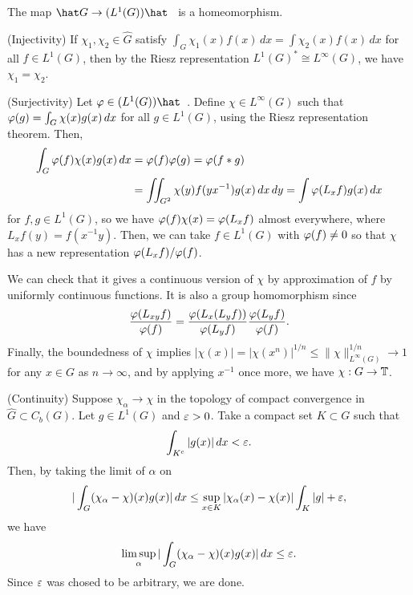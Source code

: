 \documentclass[a4paper]{article}
\begin{document}
\begin{prop}
The map $\hat G\to(L^1(G))\hat\enspace$ is a homeomorphism.
\end{prop}
\begin{pf}
(Injectivity)
If $\chi_1,\chi_2\in\hat G$ satisfy $\int_G\chi_1(x)f(x)\,dx=\int\chi_2(x)f(x)\,dx$ for all $f\in L^1(G)$, then by the Riesz representation $L^1(G)^*\cong L^\infty(G)$, we have $\chi_1=\chi_2$.


(Surjectivity)
Let $\f\in(L^1(G))\hat\enspace$.
Define $\chi\in L^\infty(G)$ such that $\varphi(g)=\int_G\chi(x)g(x)\,dx$ for all $g\in L^1(G)$, using the Riesz representation theorem.
Then,
\begin{align*}
\int_G\varphi(f)\chi(x)g(x)\,dx&=\varphi(f)\varphi(g)=\varphi(f*g)\\
&=\iint_{G^2}\chi(y)f(yx^{-1})g(x)\,dx\,dy=\int\varphi(L_xf)g(x)\,dx
\end{align*}
for $f,g\in L^1(G)$, so we have $\varphi(f)\chi(x)=\varphi(L_xf)$ almost everywhere, where $L_xf(y)=f(x^{-1}y)$.
Then, we can take $f\in L^1(G)$ with $\varphi(f)\ne0$ so that $\chi$ has a new representation $\varphi(L_xf)/\varphi(f)$.

We can check that it gives a continuous version of $\chi$ by approximation of $f$ by uniformly continuous functions.
It is also a group homomorphism since
\[\frac{\varphi(L_{xy}f)}{\varphi(f)}=\frac{\varphi(L_x(L_yf))}{\varphi(L_yf)}\frac{\varphi(L_yf)}{\varphi(f)}.\]
Finally, the boundedness of $\chi$ implies $|\chi(x)|=|\chi(x^n)|^{1/n}\le\|\chi\|_{L^\infty(G)}^{1/n}\to1$ for any $x\in G$ as $n\to\infty$, and by applying $x^{-1}$ once more, we have $\chi:G\to\mathbb{T}$.

(Continuity)
Suppose $\chi_\alpha\to\chi$ in the topology of compact convergence in $\hat G\subset C_b(G)$.
Let $g\in L^1(G)$ and $\varepsilon>0$.
Take a compact set $K\subset G$ such that
\[\int_{K^c}|g(x)|\,dx<\varepsilon.\]
Then, by taking the limit of $\alpha$ on
\[|\int_G(\chi_\alpha-\chi)(x)g(x)|\,dx\le\sup_{x\in K}|\chi_\alpha(x)-\chi(x)|\int_K|g|+\varepsilon,\]
we have
\[\limsup_\alpha|\int_G(\chi_\alpha-\chi)(x)g(x)|\,dx\le\varepsilon.\]
Since $\varepsilon$ was chosed to be arbitrary, we are done.


\end{pf}
\end{document}
